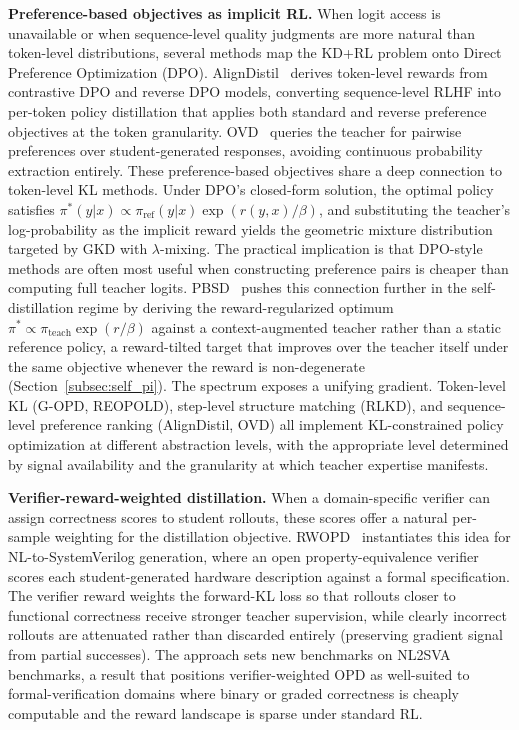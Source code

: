 \documentclass{article} %
\begin{document}
\textbf{Preference-based objectives as implicit RL.} When logit access is unavailable or when sequence-level quality judgments are more natural than token-level distributions, several methods map the KD+RL problem onto Direct Preference Optimization (DPO). AlignDistil~\citep{2503.02832} derives token-level rewards from contrastive DPO and reverse DPO models, converting sequence-level RLHF into per-token policy distillation that applies both standard and reverse preference objectives at the token granularity. OVD~\citep{2601.21968} queries the teacher for pairwise preferences over student-generated responses, avoiding continuous probability extraction entirely. These preference-based objectives share a deep connection to token-level KL methods. Under DPO's closed-form solution, the optimal policy satisfies $\pi^*(y|x) \propto \pi_{\text{ref}}(y|x) \exp(r(y,x)/\beta)$, and substituting the teacher's log-probability as the implicit reward yields the geometric mixture distribution targeted by GKD with $\lambda$-mixing. The practical implication is that DPO-style methods are often most useful when constructing preference pairs is cheaper than computing full teacher logits. PBSD~\citep{2605.05040} pushes this connection further in the self-distillation regime by deriving the reward-regularized optimum $\pi^* \propto \pi_{\text{teach}} \exp(r/\beta)$ against a context-augmented teacher rather than a static reference policy, a reward-tilted target that improves over the teacher itself under the same objective whenever the reward is non-degenerate (Section~\ref{subsec:self_pi}). The spectrum exposes a unifying gradient. Token-level KL (G-OPD, REOPOLD), step-level structure matching (RLKD), and sequence-level preference ranking (AlignDistil, OVD) all implement KL-constrained policy optimization at different abstraction levels, with the appropriate level determined by signal availability and the granularity at which teacher expertise manifests.

\textbf{Verifier-reward-weighted distillation.} When a domain-specific verifier can assign correctness scores to student rollouts, these scores offer a natural per-sample weighting for the distillation objective. RWOPD~\citep{2605.13501} instantiates this idea for NL-to-SystemVerilog generation, where an open property-equivalence verifier scores each student-generated hardware description against a formal specification. The verifier reward weights the forward-KL loss so that rollouts closer to functional correctness receive stronger teacher supervision, while clearly incorrect rollouts are attenuated rather than discarded entirely (preserving gradient signal from partial successes). The approach sets new benchmarks on NL2SVA benchmarks, a result that positions verifier-weighted OPD as well-suited to formal-verification domains where binary or graded correctness is cheaply computable and the reward landscape is sparse under standard RL.
\end{document}
